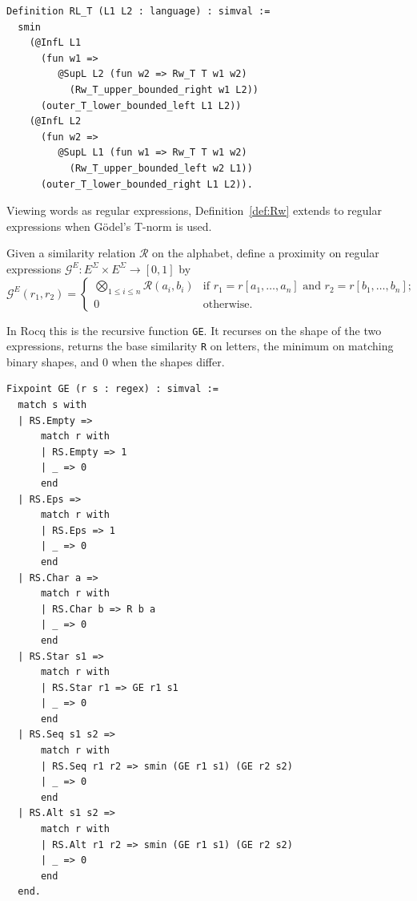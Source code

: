 \begin{lstlisting}[style=rocqstyle,caption={Similarity on languages (\texttt{SimilarityRelations.v}).},label={lst:RL}]
Definition RL_T (L1 L2 : language) : simval :=
  smin
    (@InfL L1
      (fun w1 =>
         @SupL L2 (fun w2 => Rw_T T w1 w2)
           (Rw_T_upper_bounded_right w1 L2))
      (outer_T_lower_bounded_left L1 L2))
    (@InfL L2
      (fun w2 =>
         @SupL L1 (fun w1 => Rw_T T w1 w2)
           (Rw_T_upper_bounded_left w2 L1))
      (outer_T_lower_bounded_right L1 L2)).
\end{lstlisting}

Viewing words as regular expressions, Definition~\ref{def:Rw} extends to
regular expressions when Gödel's T-norm is used.

\begin{definition}\label{def:Rexp-godel}
Given a similarity relation $\mathcal{R}$ on the alphabet, define a proximity on
regular expressions $\mathcal{G}^{E}:E^{\Sigma}\times E^{\Sigma}\to[0,1]$ by
\[
\mathcal{G}^{E}(r_1,r_2)=
\begin{cases}
\bigotimes_{1\le i\le n}\mathcal{R}(a_i,b_i)
  & \text{if } r_1=r[a_1,\ldots,a_n] \text{ and } r_2=r[b_1,\ldots,b_n];\\[0.4ex]
0 & \text{otherwise.}
\end{cases}
\]
\end{definition}

In Rocq this is the recursive function \texttt{GE}. It recurses on the shape of the
two expressions, returns the base similarity \texttt{R} on letters, the minimum on
matching binary shapes, and $0$ when the shapes differ.

\begin{lstlisting}[style=rocqstyle,caption={Gödel similarity on regular expressions (\texttt{SimilarityRelations.v}).},label={lst:GE}]
Fixpoint GE (r s : regex) : simval :=
  match s with
  | RS.Empty =>
      match r with
      | RS.Empty => 1
      | _ => 0
      end
  | RS.Eps =>
      match r with
      | RS.Eps => 1
      | _ => 0
      end
  | RS.Char a =>
      match r with
      | RS.Char b => R b a
      | _ => 0
      end
  | RS.Star s1 =>
      match r with
      | RS.Star r1 => GE r1 s1
      | _ => 0
      end
  | RS.Seq s1 s2 =>
      match r with
      | RS.Seq r1 r2 => smin (GE r1 s1) (GE r2 s2)
      | _ => 0
      end
  | RS.Alt s1 s2 =>
      match r with
      | RS.Alt r1 r2 => smin (GE r1 s1) (GE r2 s2)
      | _ => 0
      end
  end.
\end{lstlisting}


